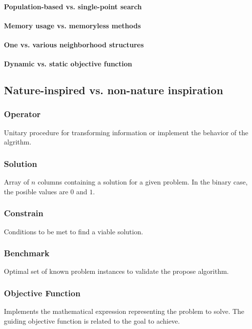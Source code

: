 \paragraph{Population-based vs. single-point search}

\paragraph{Memory usage vs. memoryless methods}

\paragraph{One vs. various neighborhood structures}

\paragraph{Dynamic vs. static objective function}

\subsection{Nature-inspired vs. non-nature inspiration }

\subsubsection{Operator} 
Unitary procedure for transforming information or implement the behavior of the algrithm.

\subsubsection{Solution} 
Array of $n$ columns containing a solution for a given problem. In the binary case, the posible values are $0$ and $1$.

\subsubsection{Constrain} 
Conditions to be met to find a viable solution.

\subsubsection{Benchmark} 
Optimal set of known problem instances to validate the propose algorithm.

\subsubsection{Objective Function}  
Implements the mathematical expression representing the problem to solve. The guiding objective function is related to the goal to achieve.

